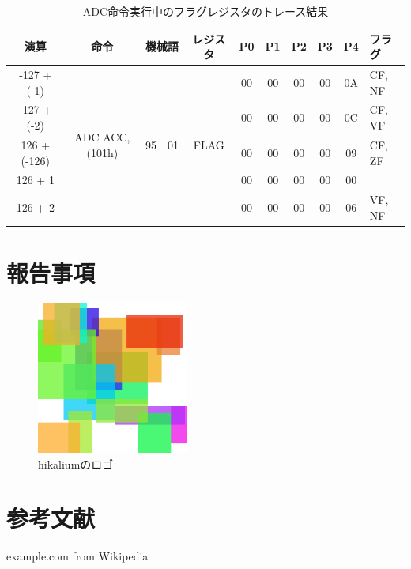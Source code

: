 \begin{table}[htb]
\caption{ADC命令実行中のフラグレジスタのトレース結果}
\begin{center}
\begin{tabular}
{c|c|c|c|c|c|c|c|c|c|l}
\hline
演算 & 命令 & \multicolumn{2}{c|}{機械語} & レジスタ & P0 & P1 & P2 & P3 & P4 & フラグ  \\ \hline

-127 + (-1)&
\multirow{5}{*}{ADC ACC, (101h)}&
\multirow{5}{*}{95} & \multirow{5}{*}{01} 
		& \multirow{5}{*}{FLAG}	& 00 & 00 & 00 & 00 & 0A & CF, NF \\
\cline{1-1} \cline{6-11}

-127 + (-2) & & & & & 00 & 00 & 00 & 00 & 0C & CF, VF \\
\cline{1-1} \cline{6-11}
126 + (-126) & & & & & 00 & 00 & 00 & 00 & 09 & CF, ZF \\
\cline{1-1} \cline{6-11}
126 + 1 & & & & & 00 & 00 & 00 & 00 & 00 &  \\
\cline{1-1} \cline{6-11}
126 + 2 & & & & & 00 & 00 & 00 & 00 & 06 & VF, NF \\
\hline

\end{tabular}
\end{center}
\label{adctrace}
\end{table}


\section{報告事項}

\begin{figure}[p]
\centering
\includegraphics[height=5cm]{data/logo.png}
\caption{hikaliumのロゴ}
\label{logo}
\end{figure}




\section{参考文献}
\begingroup
\renewcommand{\section}[2]{}
\begin{thebibliography}{3}
	 example.com from Wikipedia
\end{thebibliography}
\endgroup


